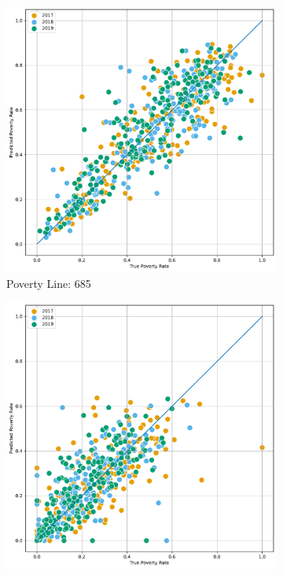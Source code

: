 \begin{figure}[H]
    \caption{Correlation: Predicted Poverty against true by Province (WB Version)}
    \centering
         \centering
         \begin{subfigure}[b]{0.47\textwidth}
             \centering
             \includegraphics[width=\textwidth]{../figures/fig4_2_prediction_wb_vs_true_poverty_rate_provincia_p685_scatter.pdf}
             \caption{Poverty Line: 685}
         \end{subfigure}
         \hfill
         \begin{subfigure}[b]{0.47\textwidth}
             \centering
             \includegraphics[width=\textwidth]{../figures/fig4_2_prediction_wb_vs_true_poverty_rate_provincia_p365_scatter.pdf}

\end{subfigure}
\end{figure}
